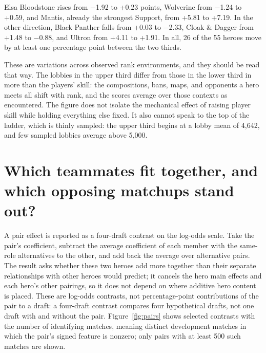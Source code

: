 \documentclass[11pt]{article}
\begin{document}
Elsa Bloodstone rises from $-$1.92 to +0.23 points, Wolverine from $-$1.24 to +0.59,
and Mantis, already the strongest Support, from +5.81 to +7.19. In the other direction,
Black Panther falls from +0.03 to $-$2.33, Cloak \& Dagger from +1.48 to $-$0.88, and Ultron
from +4.11 to +1.91. In all, 26 of the 55 heroes move by at least one percentage
point between the two thirds.

These are variations across observed rank environments, and they should be read that way. The lobbies in
the upper third differ from those in the lower third in more than the players' skill: the compositions,
bans, maps, and opponents a hero meets all shift with rank, and the scores average over those contexts as
encountered. The figure does not isolate the mechanical effect of raising player skill while holding
everything else fixed. It also cannot speak to the top of the ladder, which is thinly sampled: the upper
third begins at a lobby mean of 4,642, and few sampled lobbies average above 5{,}000.

\section*{Which teammates fit together, and which opposing matchups stand out?}

A pair effect is reported as a four-draft contrast on the log-odds scale. Take the pair's coefficient,
subtract the average coefficient of each member with the same-role alternatives to the other, and add back
the average over alternative pairs. The result asks whether these two heroes add more together than their
separate relationships with other heroes would predict; it cancels the hero main effects and each hero's
other pairings, so it does not depend on where additive hero content is placed. These are log-odds
contrasts, not percentage-point contributions of the pair to a draft: a four-draft contrast compares
four hypothetical drafts, not one draft with and without the pair. Figure~\ref{fig:pairs} shows selected
contrasts with the number of identifying matches, meaning distinct development matches in which the
pair's signed feature is nonzero; only pairs with at least 500 such matches are shown.
\end{document}
